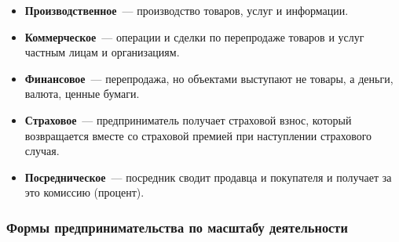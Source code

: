 \documentclass[12pt]{article}
\begin{document}
    \begin{itemize}
    	\item \textbf{Производственное}~--- производство товаров, услуг и информации.
    	\item \textbf{Коммерческое}~--- операции и сделки по перепродаже товаров и услуг частным лицам и организациям.
    	\item \textbf{Финансовое}~--- перепродажа, но объектами выступают не товары, а деньги, валюта, ценные бумаги.
    	\item \textbf{Страховое}~--- предприниматель получает страховой взнос, который возвращается вместе со страховой премией при наступлении страхового случая.
    	\item \textbf{Посредническое}~--- посредник сводит продавца и покупателя и получает за это комиссию (процент).
    \end{itemize}
    
    \subsubsection{Формы предпринимательства по масштабу деятельности}
    
\end{document}
